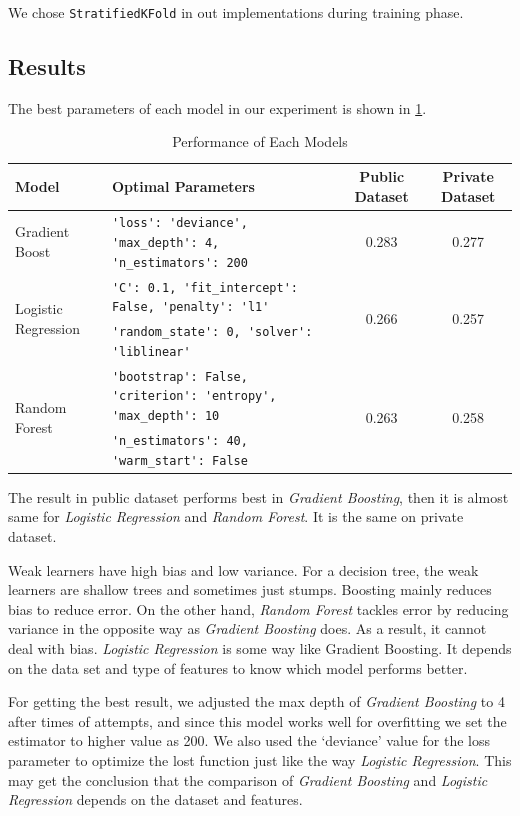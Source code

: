\documentclass{standalone}
\begin{document}
We chose \verb|StratifiedKFold| in out implementations during training phase.

\subsection{Results}

The best parameters of each model in our experiment is shown in
\cref{performance}.

\begin{table}[!t]
\centering
\caption{Performance of Each Models}\label{performance}
\begin{tabular}{llcc}
\toprule
\bfseries Model & \bfseries Optimal Parameters &Public Dataset & Private Dataset\\\midrule
Gradient Boost & \verb|'loss': 'deviance', 'max_depth': 4, 'n_estimators': 200| & 0.283 & 0.277  \\\hline
\multirow{2}{*}{Logistic Regression} & \verb|'C': 0.1, 'fit_intercept': False, 'penalty': 'l1'| & \multirow{2}{*}{0.266} & \multirow{2}{*}{0.257}  \\
& \verb|'random_state': 0, 'solver': 'liblinear'| &  & \\\hline
\multirow{2}{*}{Random Forest} & \verb|'bootstrap': False, 'criterion': 'entropy', 'max_depth': 10| & \multirow{2}{*}{0.263} & \multirow{2}{*}{0.258} \\
& \verb|'n_estimators': 40, 'warm_start': False| &&\\\bottomrule
\end{tabular}
\end{table}

The result in public dataset performs best in \emph{Gradient Boosting}, then it
is almost same for \emph{Logistic Regression} and \emph{Random Forest}. It is
the same on private dataset.

Weak learners have high bias and low variance. For a decision tree, the weak
learners are shallow trees and sometimes just stumps. Boosting mainly reduces
bias to reduce error. On the other hand, \emph{Random Forest} tackles error by
reducing variance in the opposite way as \emph{Gradient Boosting} does. As a
result, it cannot deal with bias.
\emph{Logistic Regression} is some way like Gradient Boosting. It depends on
the data set and type of features to know which model performs better.

For getting the best result, we adjusted the max depth of \emph{Gradient
Boosting} to 4 after times of attempts, and since this model works well for
overfitting we set the estimator to higher value as 200. We also used the
`deviance' value for the loss parameter to optimize the lost function just like
the way \emph{Logistic Regression}. This may get the conclusion that the
comparison of \emph{Gradient Boosting} and \emph{Logistic Regression} depends
on the dataset and features.
\end{document}
